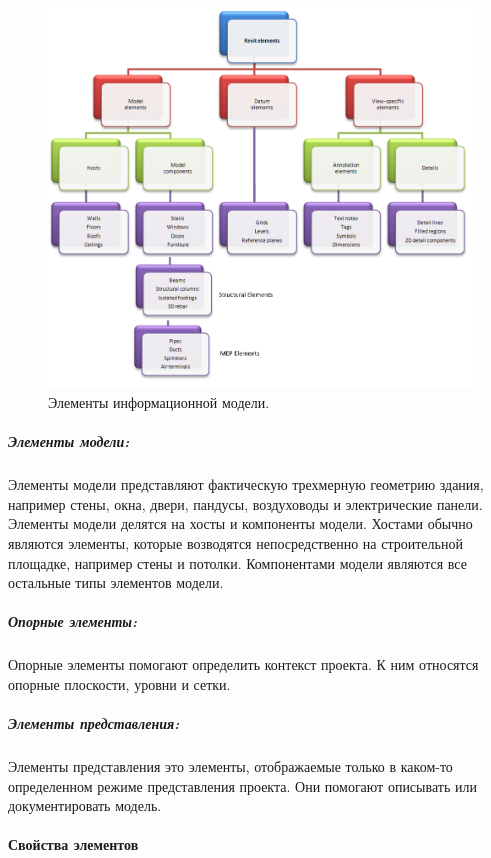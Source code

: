 \begin{figure}[h]
    \includegraphics[width=\textwidth]{images/Revit-elements.png}
    \caption{Элементы информационной модели.%
    \cite{DocRevit}}
    \label{figure:RevitElements}
\end{figure}

\subparagraph{Элементы модели:}

Элементы модели представляют фактическую трехмерную геометрию здания,
например стены, окна, двери, пандусы,
воздуховоды и электрические панели.
Элементы модели делятся на хосты и компоненты модели.
Хостами обычно являются элементы,
которые возводятся непосредственно на строительной площадке,
например стены и потолки.
Компонентами модели являются все остальные типы элементов модели.

\subparagraph{Опорные элементы:}

Опорные элементы помогают определить контекст проекта.
К ним относятся опорные плоскости, уровни и сетки.

\subparagraph{Элементы представления:}

Элементы представления это элементы,
отображаемые только в каком-то определенном режиме представления проекта.
Они помогают описывать или документировать модель.

\paragraph{Свойства элементов}

